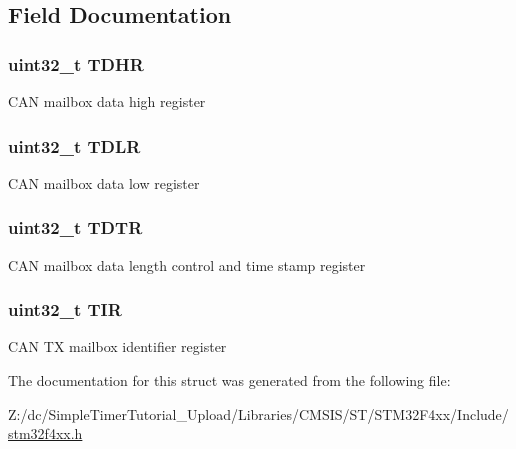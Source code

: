 \subsection{Field Documentation}
\hypertarget{struct_c_a_n___tx_mail_box___type_def_a90f7c1cf22683459c632d6040366eddf}{
\subsubsection[{T\-D\-H\-R}]{ uint32\-\_\-t T\-D\-H\-R}}\label{struct_c_a_n___tx_mail_box___type_def_a90f7c1cf22683459c632d6040366eddf}
C\-A\-N mailbox data high register \hypertarget{struct_c_a_n___tx_mail_box___type_def_aded1359e1a32512910bff534d57ade68}{
\subsubsection[{T\-D\-L\-R}]{ uint32\-\_\-t T\-D\-L\-R}}\label{struct_c_a_n___tx_mail_box___type_def_aded1359e1a32512910bff534d57ade68}
C\-A\-N mailbox data low register \hypertarget{struct_c_a_n___tx_mail_box___type_def_aed87bed042dd9523ce086119a3bab0ea}{
\subsubsection[{T\-D\-T\-R}]{ uint32\-\_\-t T\-D\-T\-R}}\label{struct_c_a_n___tx_mail_box___type_def_aed87bed042dd9523ce086119a3bab0ea}
C\-A\-N mailbox data length control and time stamp register \hypertarget{struct_c_a_n___tx_mail_box___type_def_a6921aa1c578a7d17c6e0eb33a73b6630}{
\subsubsection[{T\-I\-R}]{ uint32\-\_\-t T\-I\-R}}\label{struct_c_a_n___tx_mail_box___type_def_a6921aa1c578a7d17c6e0eb33a73b6630}
C\-A\-N T\-X mailbox identifier register 

The documentation for this struct was generated from the following file\-:\begin{DoxyCompactItemize}
\item 
Z\-:/dc/\-Simple\-Timer\-Tutorial\-\_\-\-Upload/\-Libraries/\-C\-M\-S\-I\-S/\-S\-T/\-S\-T\-M32\-F4xx/\-Include/\hyperlink{stm32f4xx_8h}{stm32f4xx.\-h}\end{DoxyCompactItemize}
